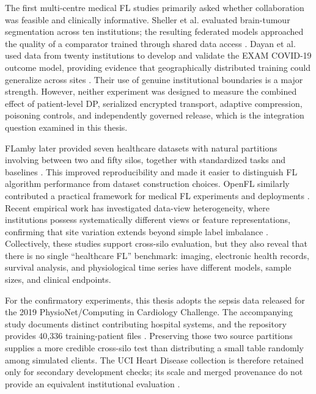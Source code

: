 The first multi-centre medical FL studies primarily asked whether collaboration was feasible and clinically informative. Sheller et al. evaluated brain-tumour segmentation across ten institutions; the resulting federated models approached the quality of a comparator trained through shared data access \cite{sheller2020federated}. Dayan et al. used data from twenty institutions to develop and validate the EXAM COVID-19 outcome model, providing evidence that geographically distributed training could generalize across sites \cite{dayan2021federated}. Their use of genuine institutional boundaries is a major strength. However, neither experiment was designed to measure the combined effect of patient-level DP, serialized encrypted transport, adaptive compression, poisoning controls, and independently governed release, which is the integration question examined in this thesis.

FLamby later provided seven healthcare datasets with natural partitions involving between two and fifty silos, together with standardized tasks and baselines \cite{ogier2022flamby}. This improved reproducibility and made it easier to distinguish FL algorithm performance from dataset construction choices. OpenFL similarly contributed a practical framework for medical FL experiments and deployments \cite{foley2022openfl}. Recent empirical work has investigated data-view heterogeneity, where institutions possess systematically different views or feature representations, confirming that site variation extends beyond simple label imbalance \cite{thakur2024heterogeneity}. Collectively, these studies support cross-silo evaluation, but they also reveal that there is no single ``healthcare FL'' benchmark: imaging, electronic health records, survival analysis, and physiological time series have different models, sample sizes, and clinical endpoints.

For the confirmatory experiments, this thesis adopts the sepsis data released for the 2019 PhysioNet/Computing in Cardiology Challenge. The accompanying study documents distinct contributing hospital systems, and the repository provides 40,336 training-patient files \cite{reyna2020early,physionet2019sepsis}. Preserving those two source partitions supplies a more credible cross-silo test than distributing a small table randomly among simulated clients. The UCI Heart Disease collection is therefore retained only for secondary development checks; its scale and merged provenance do not provide an equivalent institutional evaluation \cite{janosi1989heart}.

